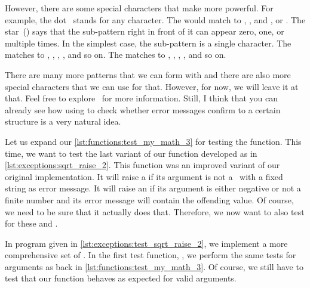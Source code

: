 However, there are some special characters that make  more powerful.
For example, the dot~ stands for any character.
The   would match to , , and , or .
The star~(\textil{*}) says that the sub-pattern right in front of it can appear zero, one, or multiple times.
In the simplest case, the sub-pattern is a single character.
The   matches to , , , , and so on.
The   matches to , , , , and so on.

There are many more patterns that we can form with  and there are also more special characters that we can use for that.
However, for now, we will leave it at that.
Feel free to explore~\cite{IEEE1993ISFITPOSIPP2SAU,PSF:P3D:PH:REH,N2018RQSRUAURE,N2019AITRE,PSF:P3D:TPSL:RREO} for more information.
Still, I think that you can already see how using  to check whether error messages confirm to a certain structure is a very natural idea.

Let us expand our \cref{lst:functions:test_my_math_3} for testing the  function.
This time, we want to test the last variant of our  function developed as   in \cref{lst:exceptions:sqrt_raise_2}.
This function was an improved variant of our original  implementation.
It will raise a  if its argument is not a~ with a fixed string as error message.
It will raise an  if its argument is either negative or not a finite number and its error message will contain the offending value.
Of course, we need to be sure that it actually does that.
Therefore, we now want to also test for these  and .

In program  given in \cref{lst:exceptions:test_sqrt_raise_2}, we implement a more comprehensive set of .
In the first test function, , we perform the same tests for  arguments as back in \cref{lst:functions:test_my_math_3}.
Of course, we still have to test that our function behaves as expected for valid arguments.

